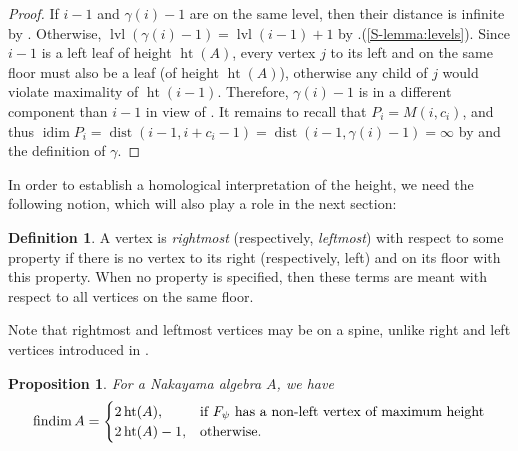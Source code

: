 \documentclass[a4paper]{amsart}
\newtheorem{proposition}[theorem]{Proposition}
\theoremstyle{definition}
\newtheorem{definition}[theorem]{Definition}
\theoremstyle{remark}
\numberwithin{equation}{theorem}
\newcommand{\Dfn}[1]{\emph{\color{blue}#1}} %
\newcommand{\findim}{\operatorname{findim}}
\newcommand{\height}{\operatorname{ht}}
\newcommand{\idim}{\operatorname{idim}}
\newcommand{\dist}{\operatorname{dist}}
\newcommand{\level}{\operatorname{lvl}}
\newcommand{\psiforest}{F_\psi}
\begin{document}
\begin{proof}
    If $i-1$ and $ \gamma(i)-1 $ are on the same level, then their distance is infinite by . Otherwise, $ \level(\gamma(i)-1) = \level(i-1)+1 $ by .(\ref{S-lemma:levels}).
    Since $ i-1 $ is a left leaf of height $ \height(A) $, every vertex $ j $ to its left and on the same floor must also be a leaf (of height $ \height(A) $), otherwise any child of $j$ would violate maximality of $ \height(i-1) $. Therefore, $ \gamma(i)-1 $ is in a different component than $i-1$ in view of .
    It remains to recall that $ P_i = M( i, c_i ) $, and thus $ \idim P_i = \dist ( i-1, i+c_i-1 ) = \dist( i-1, \gamma(i)-1 ) = \infty $ by  and the definition of $ \gamma $.
\end{proof}


In order to establish a homological interpretation of the height, we need the following notion, which will also play a role in the next section:

\begin{definition}
     A vertex is \Dfn{rightmost} (respectively, \Dfn{leftmost}) with respect to some property if there is no vertex to its right (respectively, left) and on its floor with this property. When no property is specified, then these terms are meant with respect to all vertices on the same floor.
\end{definition}

Note that rightmost and leftmost vertices may be on a spine, unlike right and left vertices introduced in .

\begin{proposition}\label{prop:findimA}
    For a Nakayama algebra $ A $, we have
         \[
            \findim A =
            \begin{cases}
                2 \height(A) , & \text{if $ \psiforest $ has a non-left vertex of maximum height} \\
                2 \height(A)-1  , & \text{otherwise.}
                    \end{cases}
        \]
\end{proposition}
\end{document}
